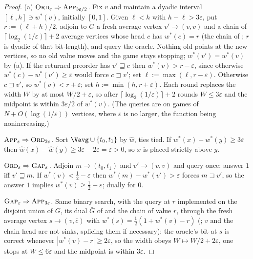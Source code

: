 \begin{proof}
(a) \emph{$\textsc{Ord}_\varepsilon\Rightarrow\textsc{App}_{3\varepsilon/2}$.}
Fix $v$ and maintain a dyadic interval $[\ell,h]\ni w^\ast(v)$, initially
$[0,1]$. Given $\ell<h$ with $h-\ell>3\varepsilon$, put $r:=(\ell+h)/2$,
adjoin to $G$ a fresh average vertex $v'\to(v,v)$ and a chain of
$\lceil\log_2(1/\varepsilon)\rceil+2$ average vertices whose head $c$ has
$w^\ast(c)=r$ (the chain of ; $r$ is dyadic of
that bit-length), and query the oracle. Nothing old points at the new
vertices, so no old value moves and the game stays stopping;
$w^\ast(v')=w^\ast(v)$ by (a). If the returned preorder has
$v'\sqsupseteq c$ then $w^\ast(v)>r-\varepsilon$, since otherwise
$w^\ast(c)-w^\ast(v')\ge\varepsilon$ would force $c\sqsupset v'$; set
$\ell:=\max(\ell,r-\varepsilon)$. Otherwise $c\sqsupset v'$, so
$w^\ast(v)<r+\varepsilon$; set $h:=\min(h,r+\varepsilon)$. Each round replaces
the width $W$ by at most $W/2+\varepsilon$, so after
$\lceil\log_2(1/\varepsilon)\rceil+2$ rounds $W\le3\varepsilon$ and the
midpoint is within $3\varepsilon/2$ of $w^\ast(v)$. (The queries are on games
of $N+O(\log(1/\varepsilon))$ vertices, where $\varepsilon$ is no larger, the
function being nonincreasing.)

\emph{$\textsc{App}_{\varepsilon}\Rightarrow\textsc{Ord}_{3\varepsilon}$.}
Sort $\Vavg\cup\{t_0,t_1\}$ by $\hat w$, ties tied. If
$w^\ast(x)-w^\ast(y)\ge3\varepsilon$ then
$\hat w(x)-\hat w(y)\ge3\varepsilon-2\varepsilon=\varepsilon>0$, so $x$ is
placed strictly above $y$.

\emph{$\textsc{Ord}_\varepsilon\Rightarrow\textsc{Gap}_\varepsilon$.} Adjoin
$m\to(t_0,t_1)$ and $v'\to(v,v)$ and query once: answer $1$ iff
$v'\sqsupseteq m$. If $w^\ast(v)<\tfrac12-\varepsilon$ then
$w^\ast(m)-w^\ast(v')>\varepsilon$ forces $m\sqsupset v'$, so the answer $1$
implies $w^\ast(v)\ge\tfrac12-\varepsilon$; dually for $0$.

\emph{$\textsc{Gap}_\varepsilon\Rightarrow\textsc{App}_{3\varepsilon}$.} Same
binary search, with the query at $r$ implemented on the disjoint union of $G$,
its dual $\bar G$ of  and the chain of value $r$, through the
fresh average vertex $s\to(v,\bar c)$ with
$w^\ast(s)=\tfrac12(1+w^\ast(v)-r)$ (; $v$ and the chain
head are not sinks, splicing them if necessary): the oracle's bit at $s$ is
correct whenever $|w^\ast(v)-r|\ge2\varepsilon$, so the width obeys
$W\mapsto W/2+2\varepsilon$, one stops at $W\le6\varepsilon$ and the midpoint
is within $3\varepsilon$.


\end{proof}
